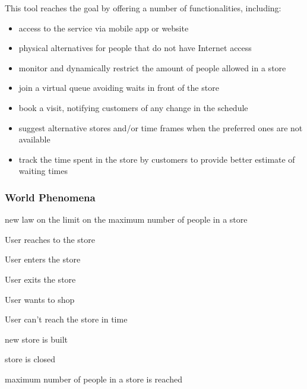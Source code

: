 This tool reaches the goal by offering a number of functionalities, including:
\begin{itemize}
    \item access to the service via mobile app or website
    \item physical alternatives for people that do not have Internet access
    \item monitor and dynamically restrict the amount of people allowed in a store
    \item join a virtual queue avoiding waits in front of the store
    \item book a visit, notifying customers of any change in the schedule
    \item suggest alternative stores and/or time frames when the preferred ones are not available
    \item track the time spent in the store by customers to provide better estimate of waiting times
\end{itemize}

\subsubsection{World Phenomena}
\begin{enumerate}[label={[WP\arabic*]}]
    \item new law on the limit on the maximum number of people in a store
    \item User reaches to the store
    \item User enters the store
    \item User exits the store
    \item User wants to shop
    \item User can't reach the store in time
    \item new store is built
    \item store is closed
    \item maximum number of people in a store is reached
\end{enumerate}

